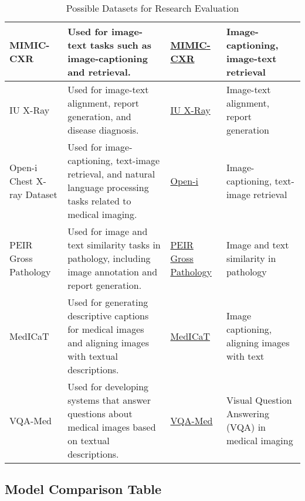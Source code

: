 \begin{table}[ht]
\begin{tabular}{|l|p{5cm}|l|p{5cm}|}
MIMIC-CXR                        & Used for image-text tasks such as image-captioning and retrieval.                                                    & \href{https://physionet.org/content/mimic-cxr/2.0.0/}{MIMIC-CXR}           & Image-captioning, image-text retrieval                \\ \hline
IU X-Ray                         & Used for image-text alignment, report generation, and disease diagnosis.                                              & \href{https://openi.nlm.nih.gov/imgs/collections/NLM-MontgomeryCXRSet.zip}{IU X-Ray} & Image-text alignment, report generation              \\ \hline
Open-i Chest X-ray Dataset       & Used for image-captioning, text-image retrieval, and natural language processing tasks related to medical imaging.    & \href{https://openi.nlm.nih.gov/}{Open-i}                                  & Image-captioning, text-image retrieval               \\ \hline
PEIR Gross Pathology             & Used for image and text similarity tasks in pathology, including image annotation and report generation.             & \href{https://peir.path.uab.edu/library/}{PEIR Gross Pathology}            & Image and text similarity in pathology               \\ \hline
MedICaT                          & Used for generating descriptive captions for medical images and aligning images with textual descriptions.            & \href{https://github.com/allenai/medicat}{MedICaT}                         & Image captioning, aligning images with text          \\ \hline
VQA-Med                          & Used for developing systems that answer questions about medical images based on textual descriptions.                 & \href{https://www.imageclef.org/2019/medical/vqa}{VQA-Med}                 & Visual Question Answering (VQA) in medical imaging   \\ \hline
\end{tabular}
\caption{Possible Datasets for Research Evaluation}
\label{tab:datasets}
\end{table}



\subsection {Model Comparison Table}


